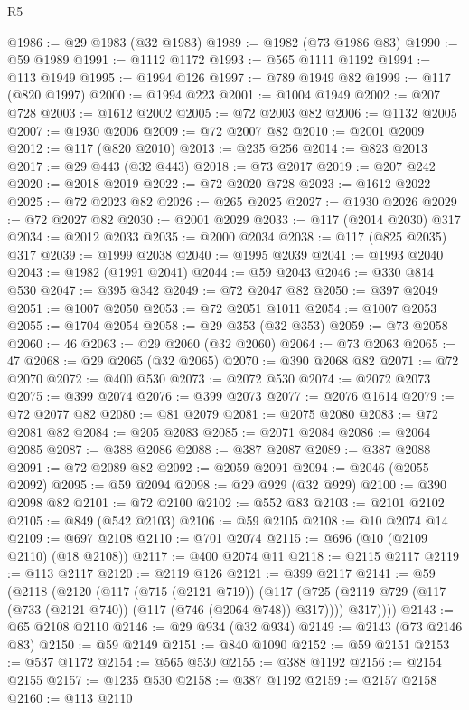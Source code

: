 \begin{lexlean}{R5}
\begin{coremodule}
@1986 := @29 @1983 (@32 @1983)
@1989 := @1982 (@73 @1986 @83)
@1990 := @59 @1989
@1991 := @1112 @1172
@1993 := @565 @1111 @1192
@1994 := @113 @1949
@1995 := @1994 @126
@1997 := @789 @1949 @82
@1999 := @117 (@820 @1997)
@2000 := @1994 @223
@2001 := @1004 @1949
@2002 := @207 @728
@2003 := @1612 @2002
@2005 := @72 @2003 @82
@2006 := @1132 @2005
@2007 := @1930 @2006
@2009 := @72 @2007 @82
@2010 := @2001 @2009
@2012 := @117 (@820 @2010)
@2013 := @235 @256
@2014 := @823 @2013
@2017 := @29 @443 (@32 @443)
@2018 := @73 @2017
@2019 := @207 @242
@2020 := @2018 @2019
@2022 := @72 @2020 @728
@2023 := @1612 @2022
@2025 := @72 @2023 @82
@2026 := @265 @2025
@2027 := @1930 @2026
@2029 := @72 @2027 @82
@2030 := @2001 @2029
@2033 := @117 (@2014 @2030) @317
@2034 := @2012 @2033
@2035 := @2000 @2034
@2038 := @117 (@825 @2035) @317
@2039 := @1999 @2038
@2040 := @1995 @2039
@2041 := @1993 @2040
@2043 := @1982 (@1991 @2041)
@2044 := @59 @2043
@2046 := @330 @814 @530
@2047 := @395 @342
@2049 := @72 @2047 @82
@2050 := @397 @2049
@2051 := @1007 @2050
@2053 := @72 @2051 @1011
@2054 := @1007 @2053
@2055 := @1704 @2054
@2058 := @29 @353 (@32 @353)
@2059 := @73 @2058
@2060 := 46
@2063 := @29 @2060 (@32 @2060)
@2064 := @73 @2063
@2065 := 47
@2068 := @29 @2065 (@32 @2065)
@2070 := @390 @2068 @82
@2071 := @72 @2070
@2072 := @400 @530
@2073 := @2072 @530
@2074 := @2072 @2073
@2075 := @399 @2074
@2076 := @399 @2073
@2077 := @2076 @1614
@2079 := @72 @2077 @82
@2080 := @81 @2079
@2081 := @2075 @2080
@2083 := @72 @2081 @82
@2084 := @205 @2083
@2085 := @2071 @2084
@2086 := @2064 @2085
@2087 := @388 @2086
@2088 := @387 @2087
@2089 := @387 @2088
@2091 := @72 @2089 @82
@2092 := @2059 @2091
@2094 := @2046 (@2055 @2092)
@2095 := @59 @2094
@2098 := @29 @929 (@32 @929)
@2100 := @390 @2098 @82
@2101 := @72 @2100
@2102 := @552 @83
@2103 := @2101 @2102
@2105 := @849 (@542 @2103)
@2106 := @59 @2105
@2108 := @10 @2074 @14
@2109 := @697 @2108
@2110 := @701 @2074
@2115 := @696 (@10 (@2109 @2110) (@18 @2108))
@2117 := @400 @2074 @11
@2118 := @2115 @2117
@2119 := @113 @2117
@2120 := @2119 @126
@2121 := @399 @2117
@2141 := @59
    (@2118
      (@2120
        (@117
          (@715 (@2121 @719))
          (@117
            (@725 (@2119 @729 (@117 (@733 (@2121 @740)) (@117 (@746 (@2064 @748)) @317))))
            @317))))
@2143 := @65 @2108 @2110
@2146 := @29 @934 (@32 @934)
@2149 := @2143 (@73 @2146 @83)
@2150 := @59 @2149
@2151 := @840 @1090
@2152 := @59 @2151
@2153 := @537 @1172
@2154 := @565 @530
@2155 := @388 @1192
@2156 := @2154 @2155
@2157 := @1235 @530
@2158 := @387 @1192
@2159 := @2157 @2158
@2160 := @113 @2110

\end{coremodule}
\end{lexlean}
